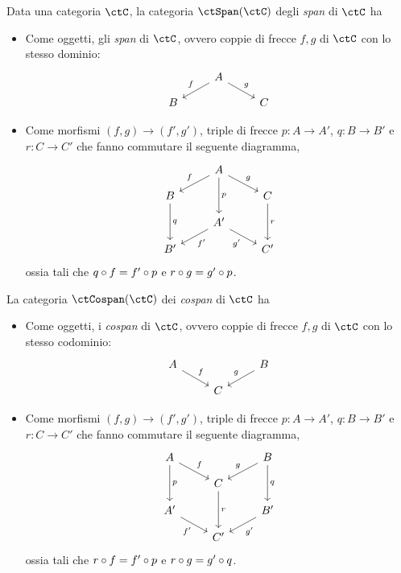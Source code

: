 \begin{definition}\label{def_span_e_cospan}
	Data una categoria \(\ctC\), la categoria \(\ctSpan(\ctC)\) degli \emph{span} di \(\ctC\) ha
	\begin{itemize}
		\item Come oggetti, gli \emph{span} di \(\ctC\), ovvero coppie di frecce \(f,g\) di \(\ctC\) con lo stesso dominio:
		      \[
			      \begin{tikzcd}[row sep=small]
				      & A \ar{dl}[swap]{f} \ar{dr}{g} \\
				      B && C
			      \end{tikzcd}
		      \]
		\item Come morfismi \((f,g)\to (f',g')\), triple di frecce \(p:A\to A'\), \(q:B\to B'\) e \(r:C\to C'\) che fanno commutare il seguente diagramma,
		      \[
			      \begin{tikzcd}[row sep=small]
				      & A \ar{dd}{p} \ar{dl}[swap]{f} \ar{dr}{g} \\
				      B \ar{dd}{q} && C \ar{dd}{r} \\
				      & A' \ar{dl}{f'} \ar{dr}[swap]{g'} \\
				      B' && C'
			      \end{tikzcd}
		      \]
		      ossia tali che \(q\circ f=f'\circ p\) e \(r\circ g=g'\circ p\).
	\end{itemize}

	La categoria \(\ctCospan(\ctC)\) dei \emph{cospan} di \(\ctC\) ha
	\begin{itemize}
		\item Come oggetti, i \emph{cospan} di \(\ctC\), ovvero coppie di frecce \(f,g\) di \(\ctC\) con lo stesso codominio:
		      \[
			      \begin{tikzcd}[row sep=small]
				      A \ar{dr}{f} && B \ar{dl}[swap]{g} \\
				      & C
			      \end{tikzcd}
		      \]
		\item Come morfismi \((f,g)\to (f',g')\), triple di frecce \(p:A\to A'\), \(q:B\to B'\) e \(r:C\to C'\) che fanno commutare il seguente diagramma,
		      \[
			      \begin{tikzcd}[row sep=small]
				      A \ar{dd}{p} \ar{dr}{f} && B \ar{dd}{q} \ar{dl}[swap]{g} \\
				      & C \ar{dd}{r} \\
				      A' \ar{dr}[swap]{f'} && B' \ar{dl}{g'} \\
				      & C'
			      \end{tikzcd}
		      \]
		      ossia tali che \(r\circ f=f'\circ p\) e \(r\circ g=g'\circ q\).
	\end{itemize}
\end{definition}

